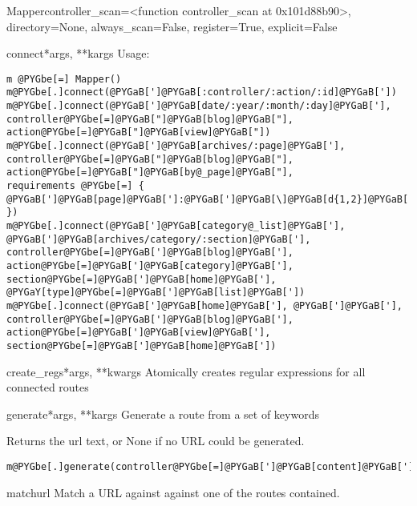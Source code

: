 \documentclass[letterpaper,10pt,english]{manual}
\begin{document}
\begin{classdesc}{Mapper}{controller\_scan=\textless{}function controller\_scan at 0x101d88b90\textgreater{}, directory=None, always\_scan=False, register=True, explicit=False}
\begin{methoddesc}{connect}{*args, **kargs}
Usage:

\begin{Verbatim}[commandchars=@\[\]]
m @PYGbe[=] Mapper()
m@PYGbe[.]connect(@PYGaB[']@PYGaB[:controller/:action/:id]@PYGaB['])
m@PYGbe[.]connect(@PYGaB[']@PYGaB[date/:year/:month/:day]@PYGaB['], controller@PYGbe[=]@PYGaB["]@PYGaB[blog]@PYGaB["], action@PYGbe[=]@PYGaB["]@PYGaB[view]@PYGaB["])
m@PYGbe[.]connect(@PYGaB[']@PYGaB[archives/:page]@PYGaB['], controller@PYGbe[=]@PYGaB["]@PYGaB[blog]@PYGaB["], action@PYGbe[=]@PYGaB["]@PYGaB[by@_page]@PYGaB["],
requirements @PYGbe[=] { @PYGaB[']@PYGaB[page]@PYGaB[']:@PYGaB[']@PYGaB[\]@PYGaB[d{1,2}]@PYGaB['] })
m@PYGbe[.]connect(@PYGaB[']@PYGaB[category@_list]@PYGaB['], @PYGaB[']@PYGaB[archives/category/:section]@PYGaB['], controller@PYGbe[=]@PYGaB[']@PYGaB[blog]@PYGaB['], action@PYGbe[=]@PYGaB[']@PYGaB[category]@PYGaB['],
section@PYGbe[=]@PYGaB[']@PYGaB[home]@PYGaB['], @PYGaY[type]@PYGbe[=]@PYGaB[']@PYGaB[list]@PYGaB['])
m@PYGbe[.]connect(@PYGaB[']@PYGaB[home]@PYGaB['], @PYGaB[']@PYGaB['], controller@PYGbe[=]@PYGaB[']@PYGaB[blog]@PYGaB['], action@PYGbe[=]@PYGaB[']@PYGaB[view]@PYGaB['], section@PYGbe[=]@PYGaB[']@PYGaB[home]@PYGaB['])
\end{Verbatim}
\end{methoddesc}

\hypertarget{routes.Mapper.create_regs}{}\begin{methoddesc}{create\_regs}{*args, **kwargs}
Atomically creates regular expressions for all connected
routes
\end{methoddesc}

\hypertarget{routes.Mapper.generate}{}\begin{methoddesc}{generate}{*args, **kargs}
Generate a route from a set of keywords

Returns the url text, or None if no URL could be generated.

\begin{Verbatim}[commandchars=@\[\]]
m@PYGbe[.]generate(controller@PYGbe[=]@PYGaB[']@PYGaB[content]@PYGaB['],action@PYGbe[=]@PYGaB[']@PYGaB[view]@PYGaB['],@PYGaY[id]@PYGbe[=]@PYGaw[10])
\end{Verbatim}
\end{methoddesc}

\hypertarget{routes.Mapper.match}{}\begin{methoddesc}{match}{url}
Match a URL against against one of the routes contained.


\end{methoddesc}
\end{classdesc}
\end{document}
